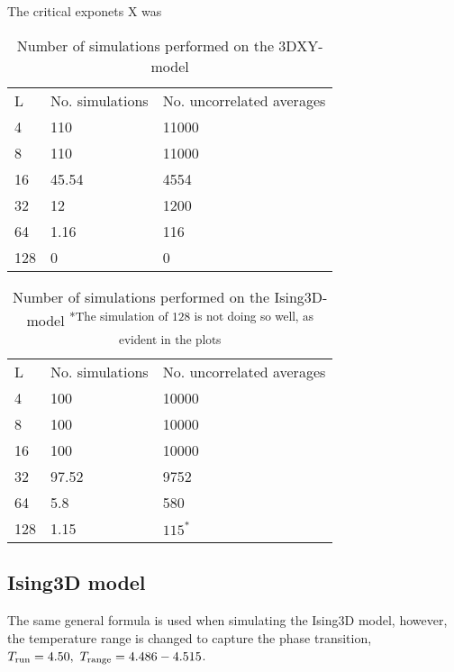 The critical exponets X was

\begin{table}[htpb]
\begin{center}
\begin{tabular}{l l l}
  L & No. simulations & No. uncorrelated averages\\
  4 & 110 & 11000\\
  8 & 110 & 11000\\
  16 & 45.54 & 4554\\
  32 & 12 & 1200\\
  64 & 1.16 & 116 \\
  128 & 0  & 0 \\
\end{tabular}
\end{center}
\caption{Number of simulations performed on the 3DXY-model}
\end{table}

\begin{table}[htpb]
\begin{center}
\begin{tabular}{l l l}
  L & No. simulations & No. uncorrelated averages\\
  4 & 100 & 10000\\
  8 & 100 & 10000\\
  16 & 100 & 10000\\
  32 & 97.52 & 9752 \\
  64 & 5.8 & 580 \\
  128 & 1.15  & $115^{*}$ \\
\end{tabular}
\end{center}
\caption{Number of simulations performed on the Ising3D-model  \textsuperscript{*The simulation of 128 is not doing so well, as evident in the plots}}
\end{table}
\subsection{Ising3D model}
The same general formula is used when simulating the Ising3D model, however, the temperature range is changed to capture the phase transition, $T_{\textrm{run}} = 4.50, ~ T_{\textrm{range}} = 4.486-4.515$.







